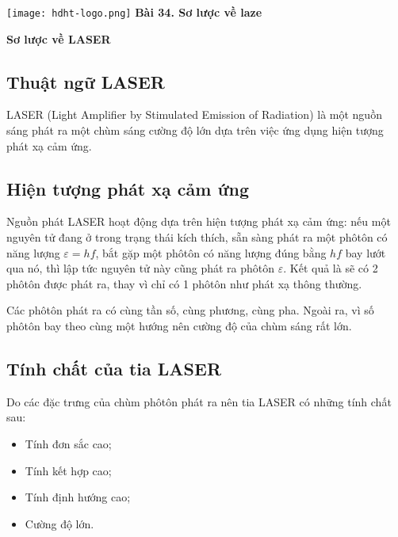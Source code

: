 \newcommand{\chapter}[2][]{
	\newcommand{\chapname}{#2}
	\begin{flushleft}
		\begin{minipage}[t]{\linewidth}
			\texttt{[image: hdht-logo.png]}
			\hspace{0pt}	
			\sffamily\bfseries\large Bài 34. Sơ lược về laze
			\begin{flushleft}
				\huge\bfseries #1
			\end{flushleft}
		\end{minipage}
	\end{flushleft}
	\vspace{1cm}
	\normalfont\normalsize
}
\chapter[Sơ lược về LASER]{Sơ lược về LASER}

\subsection{Thuật ngữ LASER}
	LASER (Light Amplifier by Stimulated Emission of Radiation) là một nguồn sáng phát ra một chùm sáng cường độ lớn dựa trên việc ứng dụng hiện tượng phát xạ cảm ứng.
\subsection{Hiện tượng phát xạ cảm ứng}
Nguồn phát LASER hoạt động dựa trên hiện tượng phát xạ cảm ứng: nếu một nguyên tử đang ở trong trạng thái kích thích, sẵn sàng phát ra một phôtôn có năng lượng $\varepsilon = hf$, bắt gặp một phôtôn có năng lượng đúng bằng $hf$ bay lướt qua nó, thì lập tức nguyên tử này cũng phát ra phôtôn $\varepsilon$. Kết quả là sẽ có 2 phôtôn được phát ra, thay vì chỉ có 1 phôtôn như phát xạ thông thường.

Các phôtôn phát ra có cùng tần số, cùng phương, cùng pha. Ngoài ra, vì số phôtôn bay theo cùng một hướng nên cường độ của chùm sáng rất lớn.
\subsection{Tính chất của tia LASER}
Do các đặc trưng của chùm phôtôn phát ra nên tia LASER có những tính chất sau:
\begin{itemize}
	\item Tính đơn sắc cao;
	\item Tính kết hợp cao;
	\item Tính định hướng cao;
	\item Cường độ lớn.
\end{itemize}

